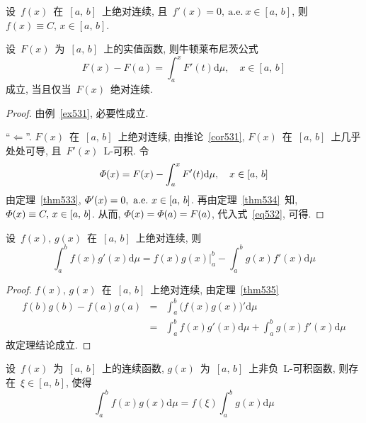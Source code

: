 \begin{theorem} \label{thm534}
设~$f(x)$~在~$[a,\,b]$~上绝对连续, 且~$f'(x) =0, \mathrm{~a.e.~} x \in [a,\,b]$, 则~$f(x) \equiv C, \, x \in [a,\,b]$.
\end{theorem}

\begin{theorem} \label{thm535}
设~$F(x)$~为~$[a,\,b]$~上的实值函数, 则牛顿\raisebox{0.5mm}{--}莱布尼茨公式
\[
F(x) - F(a) = \int_a^x F'(t) \mathrm{d} \mu, \quad x \in [a,\,b]
\]
成立, 当且仅当~$F(x)$~绝对连续.
\end{theorem}

\begin{proof}
由例~\ref{ex531}, 必要性成立.

``$\Leftarrow$''. $F(x)$~在~$[a,\,b]$~上绝对连续, 由推论~\ref{cor531}, $F(x)$~在~$[a,\,b]$~上几乎处处可导, 且~$F'(x)$~L-可积. 令
\begin{equation} \label{eq532}
\mathnormal{\Phi}(x) = F(x) - \int_a^x F'(t) \mathrm{d} \mu, \quad x \in [a,\,b]
\end{equation}
由定理~\ref{thm533}, $\mathnormal{\Phi}'(x) = 0, \mathrm{~a.e.~} x \in [a,\,b]$. 再由定理~\ref{thm534}~知, $\mathnormal{\Phi}(x) \equiv C, \, x \in [a,\,b]$. 从而, $\mathnormal{\Phi}(x) = \mathnormal{\Phi}(a) = F(a)$, 代入式~\eqref{eq532}, 可得.
\end{proof}

\begin{corollary}
设~$f(x),\,g(x)$~在~$[a,\,b]$~上绝对连续, 则
\[
\int_a^b f(x)g'(x) \mathrm{d} \mu = f(x)g(x)\big|_a^b - \int_a^b g(x)f'(x) \mathrm{d} \mu
\]
\end{corollary}

\begin{proof}
$f(x),\,g(x)$~在~$[a,\,b]$~上绝对连续, 由定理~\ref{thm535}
\begin{eqnarray*}
f(b)g(b)-f(a)g(a) &=& \int_a^b \big(f(x)g(x)\big)' \mathrm{d} \mu \\
&=& \int_a^b f(x)g'(x) \mathrm{d} \mu + \int_a^b g(x)f'(x) \mathrm{d} \mu
\end{eqnarray*}
故定理结论成立.
\end{proof}

\begin{theorem}
设~$f(x)$~为~$[a,\,b]$~上的连续函数, $g(x)$~为~$[a,\,b]$~上非负~L-可积函数, 则存在~$\xi \in [a,\,b]$, 使得
\[
\int_a^b f(x)g(x) \mathrm{d} \mu = f(\xi) \int_a^b g(x) \mathrm{d} \mu
\]
\end{theorem}

